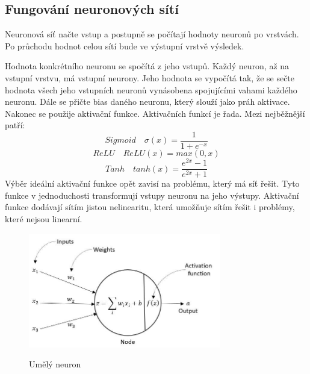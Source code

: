\subsection{Fungování neuronových sítí}
Neuronová síť načte vstup a postupně se počítají hodnoty neuronů po vrstvách.
Po průchodu hodnot celou sítí bude ve výstupní vrstvě výsledek.

Hodnota konkrétního neuronu se spočítá z jeho vstupů. Každý neuron, až na vstupní vrstvu, má vstupní neurony.
Jeho hodnota se vypočítá tak, že se sečte hodnota všech jeho vstupních neuronů vynásobena spojujícími vahami každého neuronu.
Dále se přičte bias daného neuronu, který slouží jako práh aktivace. Nakonec se použije aktivační funkce.
Aktivačních funkcí je řada.
Mezi nejběžnější patří:
\[Sigmoid\quad \sigma(x) = \frac{1}{1 + e^{-x}}\]
\[ReLU\quad ReLU(x) = max(0, x)\]
\[Tanh\quad tanh(x) = \frac{e^{2x} - 1}{e^{2x} + 1}\]
Výběr ideální aktivační funkce opět zavisí na problému, který má síť řešit.
Tyto funkce v jednoduchosti transformují vstupy neuronu na jeho výstupy.
Aktivační funkce dodávají sítím jistou nelinearitu, která umožňuje sítím řešit i problémy, které nejsou linearní.

\begin{figure}[h]
    \centering
    \includegraphics[width=0.75\textwidth]{images/neuron.jpg}
    \caption{Umělý neuron}\cite{umely_neuron}
\end{figure}

\newpage
